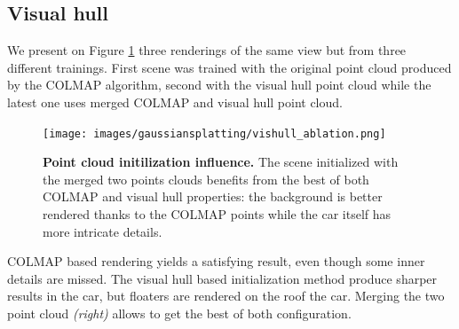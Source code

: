 \subsection{Visual hull} 

We present on Figure \ref{fig:gs-vishull-comp} three renderings of the same view but from three different trainings. First scene was trained with the original point cloud produced by the COLMAP algorithm, second with the visual hull point cloud while the latest one uses merged COLMAP and visual hull point cloud.   

\begin{figure}[htb!]
  \center
\texttt{[image: images/gaussiansplatting/vishull\_ablation.png]}
\caption{\textbf{Point cloud initilization influence.} The scene initialized with the merged two points clouds benefits from the best of both COLMAP and visual hull properties: the background is better rendered thanks to the COLMAP points while the car itself has more intricate details.}
\label{fig:gs-vishull-comp}
\end{figure}

COLMAP based rendering yields a satisfying result, even though some inner details are missed. The visual hull based initialization method produce sharper results in the car, but floaters are rendered on the roof the car. Merging the two point cloud \textit{(right)} allows to get the best of both configuration. 

